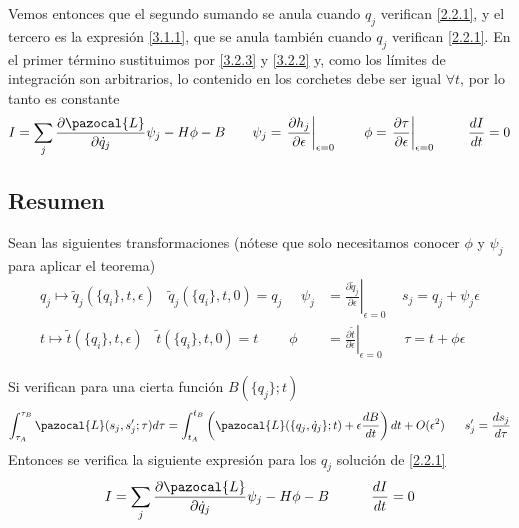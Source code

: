 Vemos entonces que el segundo sumando se anula cuando $q_j$ verifican \eqref{2.2.1}, y el tercero es la expresión \eqref{3.1.1}, que se anula también cuando $q_j$ verifican \eqref{2.2.1}. En el primer término sustituimos por \eqref{3.2.3} y \eqref{3.2.2} y, como los límites de integración son arbitrarios, lo contenido en los corchetes debe ser igual $\forall t$, por lo tanto es constante
\begin{equation} \label{3.2.11}
    I = \sum_j \frac{\partial \pazocal{L}}{\partial \dot{q}_j} \psi_j - H\phi -B \ \ \ \ \ \ \psi_j = \left.\frac{\partial h_j}{\partial \epsilon}\right|_{\epsilon=0} \ \ \ \ \ \ \phi = \left.\frac{\partial \tau}{\partial \epsilon}\right|_{\epsilon=0}  \ \ \ \ \ \ \ \frac{dI}{dt} = 0 
\end{equation} 
\vspace{-25pt}
\subsection{Resumen}
Sean las siguientes transformaciones (nótese que solo necesitamos conocer $\phi$ y $\psi_j$ para aplicar el teorema)
\vspace{-15pt}
\[
    \begin{split}
        q_j \mapsto \tilde{q}_j(\{q_i\},t,\epsilon) \ \ \ \ \tilde{q}_j(\{q_i\},t,0)=q_j  \ \ \ \ \ \  \psi_j & = \left.\frac{\partial \tilde{q}_j}{\partial \epsilon}\right|_{\epsilon=0} \ \ \ \ \ s_j = q_j + \psi_j \epsilon\\ 
        t \mapsto \tilde{t}(\{q_i\},t,\epsilon) \ \ \ \ \tilde{t}(\{q_i\},t,0)=t \ \ \ \ \ \ \ \ \ \  \phi & = \left.\frac{\partial \tilde{t}}{\partial \epsilon}\right|_{\epsilon=0} \ \ \ \ \ \ \  \tau = t + \phi \epsilon
    \end{split}     
\]

\vspace{-20pt}
Si verifican para una cierta función $B(\{q_j\};t)$
\vspace{-5pt}
\[
    \int_{\tau_A}^{\tau_B} \pazocal{L}(s_j,s'_j;\tau)d \tau=\int_{t_A}^{t_B}\left(\pazocal{L}(\{q_j,\dot{q}_j\};t) + \epsilon\frac{dB}{dt}\right)dt + O(\epsilon^2)\ \ \ \ \ s'_j = \frac{d s_j}{d \tau}
    \]
Entonces se verifica la siguiente expresión para los $q_j$ solución de \eqref{2.2.1}
\[
    I = \sum_j \frac{\partial \pazocal{L}}{\partial \dot{q}_j} \psi_j - H\phi -B \ \ \ \ \ \ \ \ \ \frac{dI}{dt} = 0 
    \]
